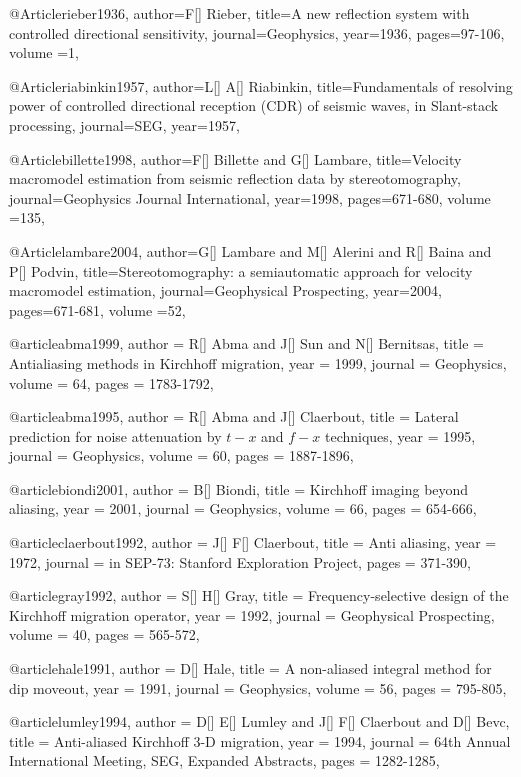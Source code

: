 @Article{rieber1936,
author={F[] Rieber},
title={A new reflection system with controlled directional sensitivity},
journal={Geophysics},
year=1936,
pages={97-106},
volume ={1},
}


@Article{riabinkin1957,
author={L[] A[] Riabinkin},
title={Fundamentals of resolving power of controlled directional reception (CDR) of seismic waves, in Slant-stack processing},
journal={SEG},
year=1957,
}

@Article{billette1998,
author={F[] Billette and G[] Lambare},
title={Velocity macromodel estimation from seismic reflection data by stereotomography},
journal={Geophysics Journal International},
year=1998,
pages={671-680},
volume ={135},
}

@Article{lambare2004,
author={G[] Lambare and M[] Alerini and R[] Baina and P[] Podvin},
title={Stereotomography: a semiautomatic approach for velocity macromodel estimation},
journal={Geophysical Prospecting},
year=2004,
pages={671-681},
volume ={52},
}

@article{abma1999,
  author =	 {R[] Abma and J[] Sun and N[] Bernitsas},
  title =	 {Antialiasing methods in Kirchhoff migration},
  year =	 1999,
  journal =	 {Geophysics},
  volume =	 64,
  pages =	 {1783-1792},
}

@article{abma1995,
  author =	 {R[] Abma and J[] Claerbout},
  title =	 {Lateral prediction for noise attenuation by $t-x$ and $f-x$ techniques},
  year =	 1995,
  journal =	 {Geophysics},
  volume =	 60,
  pages =	 {1887-1896},
}

@article{biondi2001,
  author =	 {B[] Biondi},
  title =	 {Kirchhoff imaging beyond aliasing},
  year =	 2001,
  journal =	 {Geophysics},
  volume =	 66,
  pages =	 {654-666},
}

@article{claerbout1992,
  author =	 {J[] F[] Claerbout},
  title =	 {Anti aliasing},
  year =	 1972,
  journal =	 {in SEP-73: Stanford Exploration Project},
  pages =	 {371-390},
}

@article{gray1992,
  author =	 {S[] H[] Gray},
  title =	 {Frequency-selective design of the Kirchhoff migration operator},
  year =	 1992,
  journal =	 {Geophysical Prospecting},
  volume =	 40,
  pages =	 {565-572},
}

@article{hale1991,
  author =	 {D[] Hale},
  title =	 {A non-aliased integral method for dip moveout},
  year =	 1991,
  journal =	 {Geophysics},
  volume =	 56,
  pages =	 {795-805},
}

@article{lumley1994,
  author =	 {D[] E[] Lumley and J[] F[] Claerbout and D[] Bevc},
  title =	 {Anti-aliased Kirchhoff 3-D migration},
  year =	 1994,
  journal =	 {64th Annual International Meeting, SEG, Expanded Abstracts},
  pages =	 {1282-1285},
}

